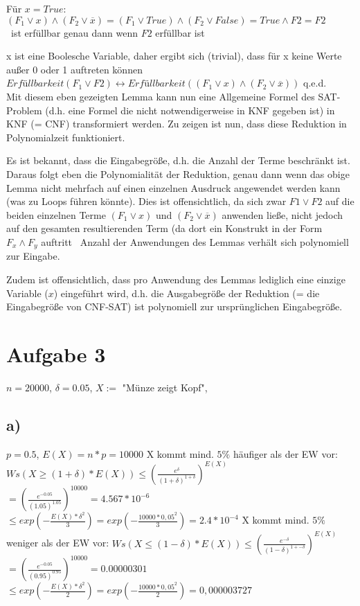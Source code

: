 \documentclass[a4paper,10pt,oneside,leqno]{scrartcl}
\begin{document}
Für $x = True$: $(F_1\vee x) \wedge (F_2 \vee \overline{x}) = (F_1\vee True) \wedge (F_2 \vee False) = True \wedge F2 = F2$\\
\textrightarrow\ ist erfüllbar genau dann wenn $F2$ erfüllbar ist

x ist eine Boolesche Variable, daher ergibt sich (trivial), dass für x keine Werte außer 0 oder 1 auftreten können \textrightarrow\ 
$Erfüllbarkeit(F_1\vee F2) \leftrightarrow Erfüllbarkeit((F_1\vee x) \wedge (F_2 \vee \overline{x}))$ q.e.d.\\[5mm]

Mit diesem eben gezeigten Lemma kann nun eine Allgemeine Formel des SAT-Problem (d.h. eine Formel die nicht notwendigerweise in KNF gegeben ist) in KNF (= CNF) transformiert werden. Zu zeigen ist nun, dass diese Reduktion in Polynomialzeit funktioniert.

Es ist bekannt, dass die Eingabegröße, d.h. die Anzahl der Terme beschränkt ist.
Daraus folgt eben die Polynomialität der Reduktion, genau dann wenn das obige Lemma nicht mehrfach auf einen einzelnen Ausdruck angewendet werden kann (was zu Loops führen könnte). Dies ist offensichtlich, da sich zwar $F1 \vee F2$ auf die beiden einzelnen Terme $(F_1\vee x)$ und $(F_2 \vee \overline{x})$ anwenden ließe, nicht jedoch auf den gesamten resultierenden Term (da dort ein Konstrukt in der Form $F_x \wedge F_y$ auftritt \textrightarrow\ Anzahl der Anwendungen des Lemmas verhält sich polynomiell zur Eingabe.

Zudem ist offensichtlich, dass pro Anwendung des Lemmas lediglich eine einzige Variable ($x$) eingeführt wird, d.h. die Ausgabegröße der Reduktion (= die Eingabegröße von CNF-SAT) ist polynomiell zur ursprünglichen Eingabegröße.

\section*{Aufgabe 3}%
$n=20000$, $\delta = 0.05$, $X :=$ "Münze zeigt Kopf",
\subsection*{a)}
$p = 0.5$, $E(X) = n*p = 10000$\newline
X kommt mind. $5\%$ häufiger als der EW vor:\newline
$Ws(X \geq (1+\delta) * E(X)) \leq (\frac{e^{\delta}}{(1+\delta)^{1+\delta}})^{E(X)}$\newline
$=(\frac{e^{-0.05}}{(1.05)^{1.05}})^{10000} = 4.567*10^{-6}$\newline
$\leq exp(-\frac{E(X)*\delta^2}{3}) = exp(-\frac{10000*0,05^2}{3}) = 2.4*10^{-4}$\newline \newline
X kommt mind. $5\%$ weniger als der EW vor:\newline
$Ws(X \leq (1-\delta) * E(X)) \leq (\frac{e^{-\delta}}{(1-\delta)^{1+-\delta}})^{E(X)}$\newline
$=(\frac{e^{-0.05}}{(0.95)^{0.95}})^{10000} = 0.00000301$\newline
$\leq exp(-\frac{E(X)*\delta^2}{2}) = exp(-\frac{10000*0,05^2}{2}) = 0,000003727$\newline
\end{document}
